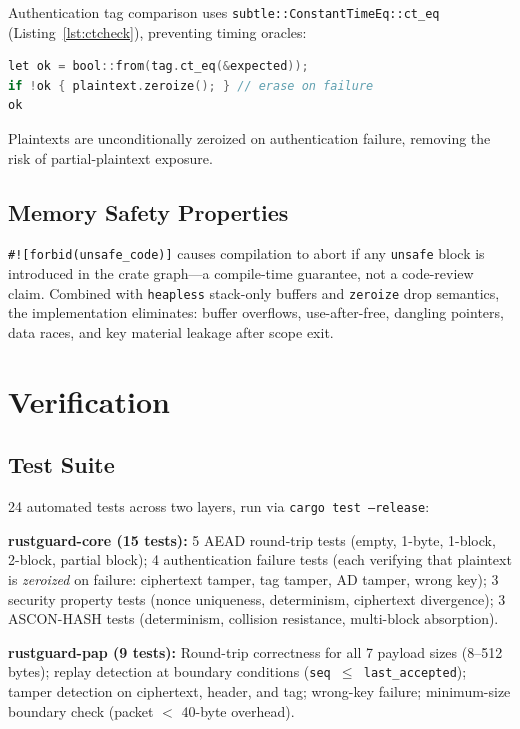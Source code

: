\documentclass[anonymous]{ndss}
\newcommand{\code}[1]{\mbox{\texttt{#1}}}
\newcommand{\forbid}{\code{\#![forbid(unsafe\_code)]}}
\begin{document}
Authentication tag comparison uses \code{subtle::ConstantTimeEq::ct\_eq}
(Listing~\ref{lst:ctcheck}), preventing timing oracles:

\begin{lstlisting}[language=C, label=lst:ctcheck,
  caption={Constant-time tag verification and plaintext zeroize.}]
let ok = bool::from(tag.ct_eq(&expected));
if !ok { plaintext.zeroize(); } // erase on failure
ok
\end{lstlisting}

Plaintexts are unconditionally zeroized on authentication failure, removing
the risk of partial-plaintext exposure.

\subsection{Memory Safety Properties}

\forbid{} causes compilation to abort if any \texttt{unsafe} block
is introduced in the crate graph---a compile-time guarantee, not a
code-review claim. Combined with \texttt{heapless} stack-only buffers
and \texttt{zeroize} drop semantics, the implementation eliminates:
buffer overflows, use-after-free, dangling pointers, data races, and
key material leakage after scope exit.

\section{Verification}
\label{sec:verification}

\subsection{Test Suite}

24 automated tests across two layers, run via \texttt{cargo test --release}:

\textbf{rustguard-core (15 tests):}
5 AEAD round-trip tests (empty, 1-byte, 1-block, 2-block, partial block);
4 authentication failure tests (each verifying that plaintext is
\emph{zeroized} on failure: ciphertext tamper, tag tamper, AD tamper,
wrong key); 3 security property tests (nonce uniqueness, determinism,
ciphertext divergence); 3 ASCON-HASH tests (determinism, collision
resistance, multi-block absorption).

\textbf{rustguard-pap (9 tests):}
Round-trip correctness for all 7 payload sizes (8--512 bytes);
replay detection at boundary conditions (\texttt{seq\,$\leq$\,last\_accepted});
tamper detection on ciphertext, header, and tag; wrong-key failure;
minimum-size boundary check (packet $<$ 40-byte overhead).
\end{document}
